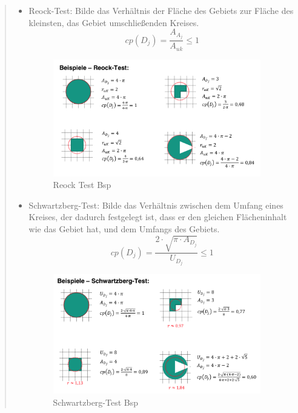      \begin{quote}
        \begin{itemize}

          \item Reock-Test: Bilde das Verhältnis der Fläche des Gebiets zur Fläche des kleinsten, das Gebiet umschließenden Kreises.
          \begin{equation*}
            cp(D_j) = \frac{A_{A_j}}{A_{uk}} \leq 1
          \end{equation*}

          \begin{figure}[H]
            \centering
            \includegraphics[width=0.95\textwidth]{Images/Reock_Test_Bsp.png}
            \caption{Reock Test Bsp}
            \label{fig:Reock-Test_Bsp}
          \end{figure}

          \item Schwartzberg-Test: Bilde das Verhältnis zwischen dem Umfang eines Kreises, der dadurch festgelegt ist, dass er den gleichen Flächeninhalt wie das Gebiet hat, und dem Umfangs des Gebiets.
          \begin{equation*}
            cp(D_j) = \frac{2 \cdot \sqrt{\pi \cdot A_{D_j}}}{U_{D_j}} \leq 1
          \end{equation*}

          \begin{figure}[H]
            \centering
            \includegraphics[width=0.95\textwidth]{Images/Schwartzberg_Test_Bsp.png}
            \caption{Schwartzberg-Test Bsp}
            \label{fig:Schwartzberg-Test_Bsp}
          \end{figure}

        \end{itemize}
      \end{quote}
        

